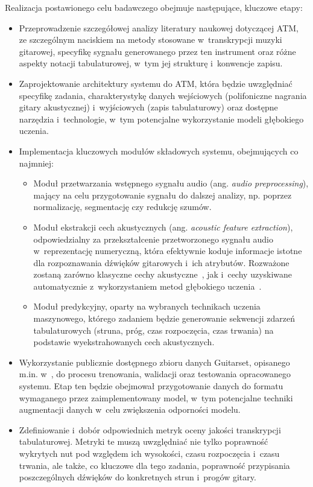 Realizacja postawionego celu badawczego obejmuje następujące, kluczowe etapy:
\begin{itemize}
    \item Przeprowadzenie szczegółowej analizy literatury naukowej dotyczącej ATM, ze szczególnym naciskiem na metody stosowane w~transkrypcji muzyki gitarowej, specyfikę sygnału generowanego przez ten instrument oraz różne aspekty notacji tabulaturowej, w~tym jej strukturę i~konwencje zapisu.
    \item Zaprojektowanie architektury systemu do ATM, która będzie uwzględniać specyfikę zadania, charakterystykę danych wejściowych (polifoniczne nagrania gitary akustycznej) i~wyjściowych (zapis tabulaturowy) oraz dostępne narzędzia i~technologie, w~tym potencjalne wykorzystanie modeli głębokiego uczenia.
    \item Implementacja kluczowych modułów składowych systemu, obejmujących co najmniej:
    \begin{itemize}
        \item Moduł przetwarzania wstępnego sygnału audio (ang. \textit{audio preprocessing}), mający na celu przygotowanie sygnału do dalszej analizy, np. poprzez normalizację, segmentację czy redukcję szumów.
        \item Moduł ekstrakcji cech akustycznych (ang. \textit{acoustic feature extraction}), odpowiedzialny za przekształcenie przetworzonego sygnału audio w~reprezentację numeryczną, która efektywnie koduje informacje istotne dla rozpoznawania dźwięków gitarowych i~ich atrybutów. Rozważone zostaną zarówno klasyczne cechy akustyczne~\autocite{KlapuriDavy2006SignalProcessing}, jak i~cechy uzyskiwane automatycznie z~wykorzystaniem metod głębokiego uczenia~\autocite{BurletHindle2017IsolatedGuitarTranscription}.
        \item Moduł predykcyjny, oparty na wybranych technikach uczenia maszynowego, którego zadaniem będzie generowanie sekwencji zdarzeń tabulaturowych (struna, próg, czas rozpoczęcia, czas trwania) na podstawie wyekstrahowanych cech akustycznych.
    \end{itemize}
    \item Wykorzystanie publicznie dostępnego zbioru danych Guitarset, opisanego m.in. w~\autocite{Wiggins2019TabCNN}, do procesu trenowania, walidacji oraz testowania opracowanego systemu. Etap ten będzie obejmował przygotowanie danych do formatu wymaganego przez zaimplementowany model, w~tym potencjalne techniki augmentacji danych w~celu zwiększenia odporności modelu.
    \item Zdefiniowanie i~dobór odpowiednich metryk oceny jakości transkrypcji tabulaturowej. Metryki te muszą uwzględniać nie tylko poprawność wykrytych nut pod względem ich wysokości, czasu rozpoczęcia i~czasu trwania, ale także, co kluczowe dla tego zadania, poprawność przypisania poszczególnych dźwięków do konkretnych strun i~progów gitary.

\end{itemize}
